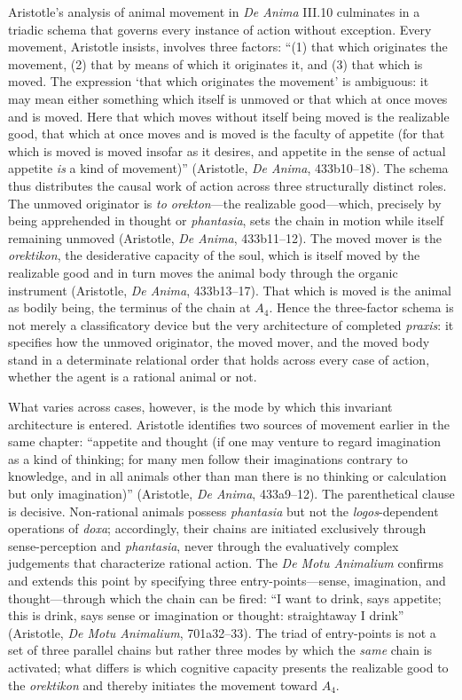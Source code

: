 \documentclass{article}
\begin{document}
Aristotle's analysis of animal movement in \textit{De Anima} III.10 culminates in a triadic schema that governs every instance of action without exception. Every movement, Aristotle insists, involves three factors: ``(1) that which originates the movement, (2) that by means of which it originates it, and (3) that which is moved. The expression `that which originates the movement' is ambiguous: it may mean either something which itself is unmoved or that which at once moves and is moved. Here that which moves without itself being moved is the realizable good, that which at once moves and is moved is the faculty of appetite (for that which is moved is moved insofar as it desires, and appetite in the sense of actual appetite \textit{is} a kind of movement)'' (Aristotle, \textit{De Anima}, 433b10--18). The schema thus distributes the causal work of action across three structurally distinct roles. The unmoved originator is \textit{to orekton}---the realizable good---which, precisely by being apprehended in thought or \textit{phantasia}, sets the chain in motion while itself remaining unmoved (Aristotle, \textit{De Anima}, 433b11--12). The moved mover is the \textit{orektikon}, the desiderative capacity of the soul, which is itself moved by the realizable good and in turn moves the animal body through the organic instrument (Aristotle, \textit{De Anima}, 433b13--17). That which is moved is the animal as bodily being, the terminus of the chain at $A_4$. Hence the three-factor schema is not merely a classificatory device but the very architecture of completed \textit{praxis}: it specifies how the unmoved originator, the moved mover, and the moved body stand in a determinate relational order that holds across every case of action, whether the agent is a rational animal or not.

What varies across cases, however, is the mode by which this invariant architecture is entered. Aristotle identifies two sources of movement earlier in the same chapter: ``appetite and thought (if one may venture to regard imagination as a kind of thinking; for many men follow their imaginations contrary to knowledge, and in all animals other than man there is no thinking or calculation but only imagination)'' (Aristotle, \textit{De Anima}, 433a9--12). The parenthetical clause is decisive. Non-rational animals possess \textit{phantasia} but not the \textit{logos}-dependent operations of \textit{doxa}; accordingly, their chains are initiated exclusively through sense-perception and \textit{phantasia}, never through the evaluatively complex judgements that characterize rational action. The \textit{De Motu Animalium} confirms and extends this point by specifying three entry-points---sense, imagination, and thought---through which the chain can be fired: ``I want to drink, says appetite; this is drink, says sense or imagination or thought: straightaway I drink'' (Aristotle, \textit{De Motu Animalium}, 701a32--33). The triad of entry-points is not a set of three parallel chains but rather three modes by which the \textit{same} chain is activated; what differs is which cognitive capacity presents the realizable good to the \textit{orektikon} and thereby initiates the movement toward $A_4$.
\end{document}
